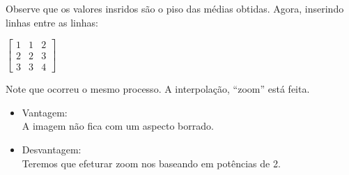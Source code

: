 \documentclass[a4paper, 12pt]{article}
\begin{document}
Observe que os valores insridos são o piso das médias obtidas. Agora, inserindo linhas entre as linhas:

\begin{table}
	\centering
	$
	\begin{bmatrix}
	1 & 1 & 2 \\
	2 & 2 & 3 \\
	3 & 3 & 4
	\end{bmatrix}
	$
\end{table}
Note que ocorreu o mesmo processo. A interpolação, ``zoom'' está feita.
\begin{itemize}
\item Vantagem:
\\
A imagem não fica com um aspecto borrado.
\item Desvantagem:
\\
Teremos que efeturar zoom nos baseando em potências de 2.
\end{itemize}
\end{document}
